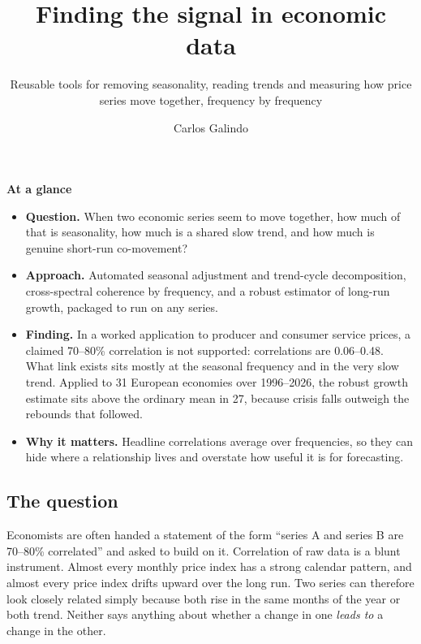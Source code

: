 \documentclass[
  british,
  a4paper,
]{article}
\title{Finding the signal in economic data}
\subtitle{Reusable tools for removing seasonality, reading trends and
measuring how price series move together, frequency by frequency}
\author{Carlos Galindo}
\date{}
\providecommand{\tightlist}{%
  \setlength{\itemsep}{0pt}\setlength{\parskip}{0pt}}
\begin{document}
\maketitle


\begin{tcolorbox}[enhanced jigsaw, arc=.35mm, bottomrule=.15mm, breakable, colback=white, colframe=quarto-callout-note-color-frame, left=2mm, leftrule=.75mm, opacityback=0, rightrule=.15mm, toprule=.15mm]

\vspace{-3mm}\textbf{At a glance}\vspace{3mm}

\begin{itemize}
\tightlist
\item
  \textbf{Question.} When two economic series seem to move together, how
  much of that is seasonality, how much is a shared slow trend, and how
  much is genuine short-run co-movement?
\item
  \textbf{Approach.} Automated seasonal adjustment and trend-cycle
  decomposition, cross-spectral coherence by frequency, and a robust
  estimator of long-run growth, packaged to run on any series.
\item
  \textbf{Finding.} In a worked application to producer and consumer
  service prices, a claimed 70--80\% correlation is not supported:
  correlations are 0.06--0.48. What link exists sits mostly at the
  seasonal frequency and in the very slow trend. Applied to 31 European
  economies over 1996--2026, the robust growth estimate sits above the
  ordinary mean in 27, because crisis falls outweigh the rebounds that
  followed.
\item
  \textbf{Why it matters.} Headline correlations average over
  frequencies, so they can hide where a relationship lives and overstate
  how useful it is for forecasting.
\end{itemize}

\end{tcolorbox}

\subsection{The question}\label{the-question}

Economists are often handed a statement of the form ``series A and
series B are 70--80\% correlated'' and asked to build on it. Correlation
of raw data is a blunt instrument. Almost every monthly price index has
a strong calendar pattern, and almost every price index drifts upward
over the long run. Two series can therefore look closely related simply
because both rise in the same months of the year or both trend. Neither
says anything about whether a change in one \emph{leads to} a change in
the other.
\end{document}
